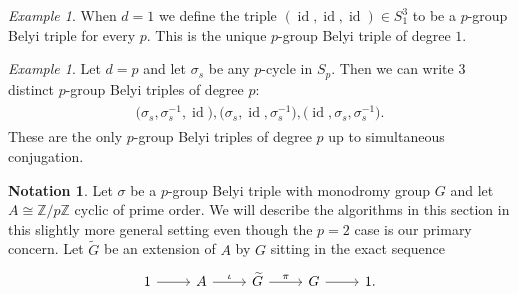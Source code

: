 \documentclass{dcthesis}
\newcommand{\ZZ}{\mathbb Z}
\newcommand{\wt}[1]{\widetilde{#1}}
\DeclareMathOperator{\id}{id}
\numberwithin{equation}{section}
\newtheorem{lemma}[equation]{Lemma}
\theoremstyle{definition}
\newtheorem{notation}[equation]{Notation}
\theoremstyle{remark}
\newtheorem{example}[equation]{Example}
\begin{document}
{{    %
    \begin{example}
      \label{exm:degree1belyitriple}
      When $d=1$ we define the triple
      $(\id,\id,\id)\in S_1^3$ to be a $p$-group
      Belyi triple for every $p$.
      This is the unique $p$-group Belyi
      triple of degree $1$.
    \end{example}
    \begin{example}
      \label{exm:degreepbelyitriple}
      Let $d=p$ and let $\sigma_s$ be
      any $p$-cycle in $S_p$.
      Then we can write $3$ distinct
      $p$-group Belyi triples
      of degree $p$:
      \begin{align}
        \label{eqn:dequalsp}
        \begin{split}
          \Big(\sigma_s,\sigma_s^{-1},\id\Big),
          \Big(\sigma_s,\id,\sigma_s^{-1}\Big),
          \Big(\id,\sigma_s,\sigma_s^{-1}\Big).
        \end{split}
      \end{align}
      These are the only $p$-group Belyi triples
      of degree $p$ up to
      simultaneous conjugation.
    \end{example}
    \begin{notation}
      \label{not:oursetting}
      Let $\sigma$ be a $p$-group Belyi triple
      with monodromy group $G$
      and
      let $A\cong\ZZ/p\ZZ$
      cyclic of prime order.
      We will describe the algorithms in this
      section in this slightly more general setting
      even though the $p=2$ case is our primary
      concern.
      Let $\wt{G}$ be an extension of $A$
      by $G$ sitting in the exact sequence
      \begin{equation}
        \label{eqn:motivateliftdefinition}
        \begin{tikzcd}
          1\arrow{r}&A\arrow{r}{\iota}
                    &\wt{G}\arrow{r}{\pi}
                    &G\arrow{r}
                    &1.
        \end{tikzcd}
      \end{equation}

\end{notation}}}
\end{document}
